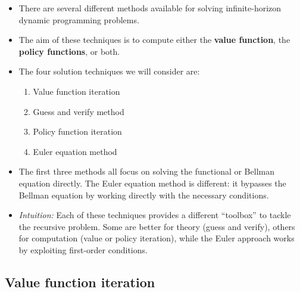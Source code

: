 \documentclass[12pt]{article}
\begin{document}
\begin{itemize}
    \item There are several different methods available for solving infinite-horizon dynamic programming problems.

    \item The aim of these techniques is to compute either the \textbf{value function}, the \textbf{policy functions}, or both.

    \item The four solution techniques we will consider are:
    \begin{enumerate}
        \item Value function iteration
        \item Guess and verify method
        \item Policy function iteration
        \item Euler equation method
    \end{enumerate}

    \item The first three methods all focus on solving the functional or Bellman equation directly. 
    The Euler equation method is different: it bypasses the Bellman equation by working directly with the necessary conditions.

    \item \textit{Intuition:} Each of these techniques provides a different “toolbox” to tackle the recursive problem. Some are better for theory (guess and verify), others for computation (value or policy iteration), while the Euler approach works by exploiting first-order conditions.
\end{itemize}

\subsection*{\noindent\textbf{Value function iteration}}
\end{document}
